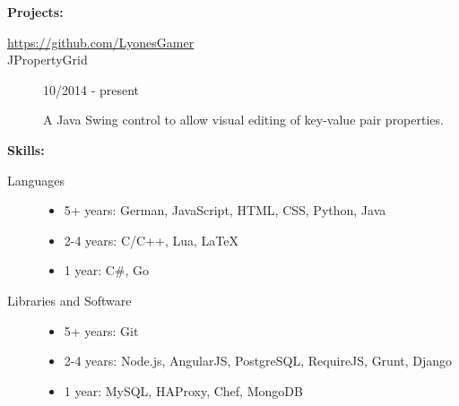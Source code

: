 \documentclass[11pt]{article}
\begin{document}
\smallskip
{\huge \textbf{Projects:}}
\hrulefill
\smallskip
\begin{description}
\item[\url{https://github.com/LyonesGamer}]
\smallskip
\item[JPropertyGrid]
\hfill 10/2014 - present

A Java Swing control to allow visual editing of key-value pair properties.

%
%
\end{description}
\bigskip
{\huge \textbf{Skills:}}
\hrulefill
\smallskip
\begin{description}
\item[Languages]
\hfill
\begin{itemize}
\item 5+ years: German, JavaScript, HTML, CSS, Python, Java
\item 2-4 years: C/C++, Lua, LaTeX
\item 1 year: C\#, Go
\end{itemize}
\item[Libraries and Software]
\hfill
\begin{itemize}
\item 5+ years: Git
\item 2-4 years: Node.js, AngularJS, PostgreSQL, RequireJS, Grunt, Django
\item 1 year: MySQL, HAProxy, Chef, MongoDB
\end{itemize}
\end{description}
\end{document}

